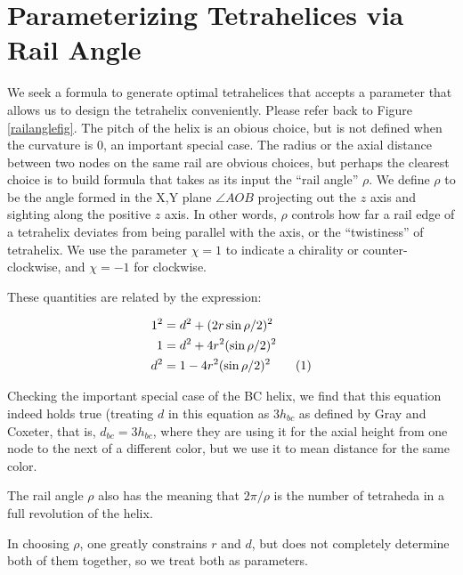 \documentclass[11pt]{article}
\newcommand\numberthis{\addtocounter{equation}{1}\tag{\theequation}}
\begin{document}
\section{Parameterizing Tetrahelices via Rail Angle}

We seek a formula to generate optimal tetrahelices that accepts a
parameter that allows us to design the tetrahelix conveniently.
Please refer back to Figure \ref{railanglefig}.
The pitch of the helix is an obious choice, but is not defined when the
curvature is $0$, an important special case. The radius or the axial
distance between two nodes on the same rail are obvious choices, but
perhaps the clearest choice is to build formula that takes as its
input the ``rail angle'' $\rho$. We define $\rho$ to be the angle
formed in the X,Y plane $\angle A O B$ projecting out the $z$
axis and sighting along the positive $z$ axis. In other words, $\rho$
controls how far a rail edge of a tetrahelix deviates from being
parallel with the axis, or the ``twistiness'' of tetrahelix. We use
the parameter $\chi = 1$ to indicate a chirality or counter-clockwise,
and $\chi = -1$ for clockwise.



 These quantities are related by the expression:

\begin{align*}
  1^2 &= d^2 + (2 r \sin{ \rho / 2})^2 \\
  1 &= d^2 + 4 r^2 (\sin{ \rho / 2})^2 \\
  d^2 &= 1 - 4 r^2 (\sin{ \rho / 2})^2    \numberthis  \label{railangle} \\
\end{align*}

Checking the important special case of the BC helix, we find that this equation
indeed holds true (treating $d$ in this equation as $3 h_{bc}$ as defined by
Gray and Coxeter, that is, $d_{bc} = 3h_{bc}$, where they are using it for the axial height from one node to
the next of a different color, but we use it to mean distance for the same color.

The rail angle $\rho$ also has the meaning that $2 \pi / \rho$ is the number of
tetraheda in a full revolution of the helix.

In choosing $\rho$, one greatly constrains $r$ and $d$, but does not completely
determine both of them together, so we treat both as parameters.
\end{document}
